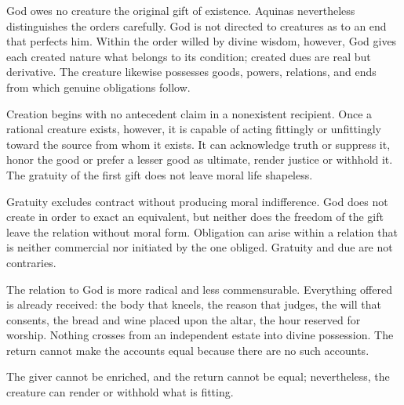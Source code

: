 God owes no creature the original gift of existence. Aquinas nevertheless distinguishes the orders carefully. God is not directed to creatures as to an end that perfects him. Within the order willed by divine wisdom, however, God gives each created nature what belongs to its condition; created dues are real but derivative. The creature likewise possesses goods, powers, relations, and ends from which genuine obligations follow.

Creation begins with no antecedent claim in a nonexistent recipient. Once a rational creature exists, however, it is capable of acting fittingly or unfittingly toward the source from whom it exists. It can acknowledge truth or suppress it, honor the good or prefer a lesser good as ultimate, render justice or withhold it. The gratuity of the first gift does not leave moral life shapeless.

Gratuity excludes contract without producing moral indifference. God does not create in order to exact an equivalent, but neither does the freedom of the gift leave the relation without moral form. Obligation can arise within a relation that is neither commercial nor initiated by the one obliged. Gratuity and due are not contraries.

The relation to God is more radical and less commensurable. Everything offered is already received: the body that kneels, the reason that judges, the will that consents, the bread and wine placed upon the altar, the hour reserved for worship. Nothing crosses from an independent estate into divine possession. The return cannot make the accounts equal because there are no such accounts.

The giver cannot be enriched, and the return cannot be equal; nevertheless, the creature can render or withhold what is fitting.

